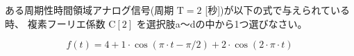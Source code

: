 ある周期性時間領域アナログ信号(周期 $\textrm{T} = 2$ [秒])が以下の式で与えられている時、
複素フーリエ係数 $\textrm{C}[2]$ を選択肢a〜dの中から1つ選びなさい。

\[
f(t) = 
4
+ 1 \cdot \cos( \pi \cdot t - \pi/2)
+ 2 \cdot \cos( 2 \cdot \pi \cdot t )
\]
